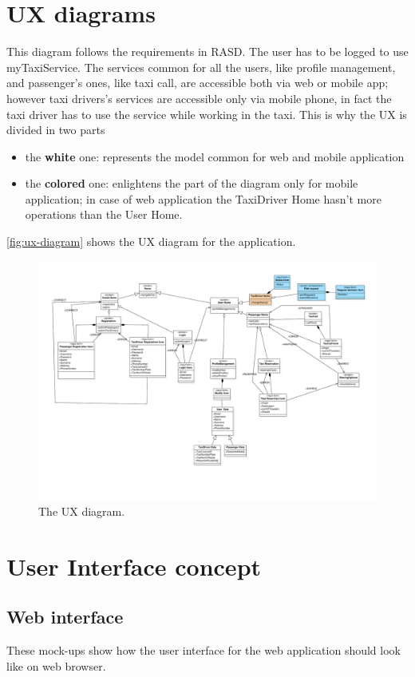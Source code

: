 \section{UX diagrams}
This diagram follows the requirements in RASD. 
The user has to be logged to use myTaxiService. 
The services common for all the users, like profile management, and passenger's ones, like taxi call, are accessible both via web or mobile app; however taxi drivers's services are accessible only via mobile phone, in fact the taxi driver has to use the service while working in the taxi.
This is why the UX is divided in two parts 
\begin{itemize}
\item the {\bf white} one: represents the model common for web and mobile application
\item the {\bf colored} one: enlightens the part of the diagram only for mobile application; in case of web application the TaxiDriver Home hasn't more operations than the User Home.
\end{itemize}
\autoref{fig:ux-diagram} shows the UX diagram for the application.

\begin{figure}[h]
\centering
\includegraphics[width=\textwidth]{diagrams/UXdiagramSE2}
\caption{The UX diagram.}
\label{fig:ux-diagram}
\end{figure}

\FloatBarrier
\section{User Interface concept}

\subsection{Web interface}
These mock-ups show how the user interface for the web application should look like on web browser.

